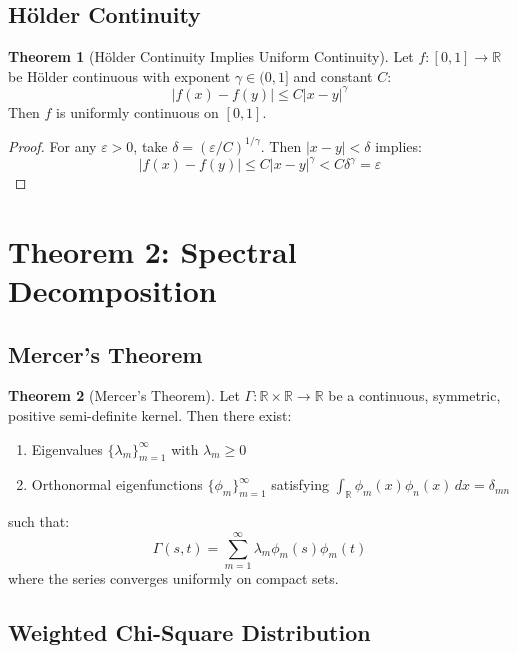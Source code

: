 \documentclass[11pt,a4paper]{article}
\theoremstyle{definition}
\newtheorem{theorem}{Theorem}[section]
\begin{document}
\subsection{Hölder Continuity}

\begin{theorem}[Hölder Continuity Implies Uniform Continuity]
Let $f: [0,1] \to \mathbb{R}$ be Hölder continuous with exponent $\gamma \in (0,1]$ and constant $C$:
\begin{equation}
|f(x) - f(y)| \leq C|x - y|^{\gamma}
\end{equation}
Then $f$ is uniformly continuous on $[0,1]$.
\end{theorem}

\begin{proof}
For any $\varepsilon > 0$, take $\delta = (\varepsilon/C)^{1/\gamma}$. Then $|x - y| < \delta$ implies:
\begin{equation}
|f(x) - f(y)| \leq C|x - y|^{\gamma} < C\delta^{\gamma} = \varepsilon
\end{equation}
\end{proof}

\section{Theorem 2: Spectral Decomposition}

\subsection{Mercer's Theorem}

\begin{theorem}[Mercer's Theorem]
Let $\Gamma: \mathbb{R} \times \mathbb{R} \to \mathbb{R}$ be a continuous, symmetric, positive semi-definite kernel. Then there exist:
\begin{enumerate}
    \item Eigenvalues $\{\lambda_m\}_{m=1}^{\infty}$ with $\lambda_m \geq 0$
    \item Orthonormal eigenfunctions $\{\phi_m\}_{m=1}^{\infty}$ satisfying $\int_{\mathbb{R}} \phi_m(x)\phi_n(x)\,dx = \delta_{mn}$
\end{enumerate}
such that:
\begin{equation}
\Gamma(s,t) = \sum_{m=1}^{\infty} \lambda_m \phi_m(s)\phi_m(t)
\end{equation}
where the series converges uniformly on compact sets.
\end{theorem}

\subsection{Weighted Chi-Square Distribution}
\end{document}
